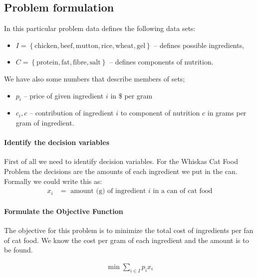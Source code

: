   
\subsection{Problem formulation}

In this particular problem data defines the following data sets:

\begin{itemize}
  \item $I = \left\{\text{chicken}, \text{beef}, \text{mutton}, \text{rice}, \text{wheat}, \text{gel}\right\}$ -- defines possible ingredients,
  \item $C = \left\{\text{protein}, \text{fat}, \text{fibre}, \text{salt}\right\}$ -- defines components of nutrition.
\end{itemize}

We have also some numbers that describe members of sets;
\begin{itemize}
  \item $p_i$ -- price of given ingredient $i$ in \$ per gram
  \item $c_i,c$ -- contribution of ingredient $i$ to component of nutrition $c$ in grams per gram of ingredient.
\end{itemize}

\paragraph{Identify the decision variables}

First of all we need to identify decision variables. For the Whiskas Cat Food Problem the decisions are the amounts of each ingredient we put in the can. Formally we could write this as:
\begin{align} 
  x_i &= \text{ amount (g) of ingredient $i$  in a can of cat food}
\end{align} 

\paragraph{Formulate the Objective Function}

The objective for this problem is to minimize the total cost of ingredients per fan of cat food. We know the cost per gram of each ingredient and the amount is to be found.

\begin{align}
   \min \mathop\sum\limits_{i \in I} p_i x_i
\end{align}

